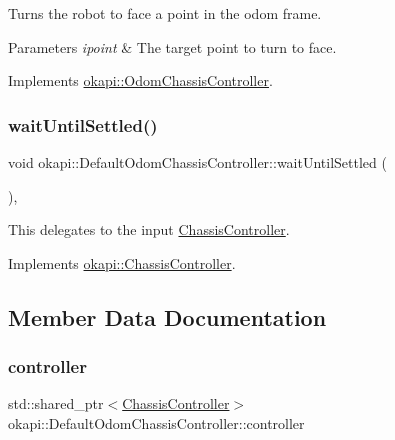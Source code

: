 Turns the robot to face a point in the odom frame.


\begin{DoxyParams}{Parameters}
{\em ipoint} & The target point to turn to face. \\
\hline
\end{DoxyParams}


Implements \mbox{\hyperlink{classokapi_1_1OdomChassisController_a4566bc34f36fd107bc868b17942f4245}{okapi\+::\+Odom\+Chassis\+Controller}}.

\mbox{\label{classokapi_1_1DefaultOdomChassisController_a44599379129060bdb44e6f603ee5777b}} 
\subsubsection{\texorpdfstring{waitUntilSettled()}{waitUntilSettled()}}
{\footnotesize\ttfamily void okapi\+::\+Default\+Odom\+Chassis\+Controller\+::wait\+Until\+Settled (\begin{DoxyParamCaption}{ }\end{DoxyParamCaption})\hspace{0.3cm}{\ttfamily [override]}, {\ttfamily [virtual]}}

This delegates to the input \mbox{\hyperlink{classokapi_1_1ChassisController}{Chassis\+Controller}}. 

Implements \mbox{\hyperlink{classokapi_1_1ChassisController_a01ed4e0eb7332cc149228387bbf1e91c}{okapi\+::\+Chassis\+Controller}}.



\subsection{Member Data Documentation}
\mbox{\label{classokapi_1_1DefaultOdomChassisController_a0513b32bd09e7af2b82a5d67895b6165}} 
\subsubsection{\texorpdfstring{controller}{controller}}
{\footnotesize\ttfamily std\+::shared\+\_\+ptr$<$\mbox{\hyperlink{classokapi_1_1ChassisController}{Chassis\+Controller}}$>$ okapi\+::\+Default\+Odom\+Chassis\+Controller\+::controller\hspace{0.3cm}{\ttfamily [protected]}}

